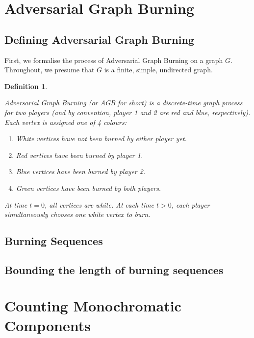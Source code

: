 \documentclass{mpaper}
\newtheorem{definition}{Definition}[section]
\begin{document}
\section{Adversarial Graph Burning}

\subsection{Defining Adversarial Graph Burning}

First, we formalise the process of Adversarial Graph Burning on a graph $G$. Throughout, we presume that $G$ is a finite, simple, undirected graph.

\begin{definition}
\label{def/AGB}

Adversarial Graph Burning (or AGB for short) is a discrete-time graph process for two players (and by convention, player 1 and 2 are red and blue, respectively). Each vertex is assigned one of 4 colours:

\begin{enumerate}
  \item \emph{White} vertices have not been burned by either player yet.
  \item \emph{Red} vertices have been burned by player 1.
  \item \emph{Blue} vertices have been burned by player 2.
  \item \emph{Green} vertices have been burned by \emph{both} players.
\end{enumerate}

At time $t=0$, all vertices are white. At each time $t > 0$, each player simultaneously chooses one white vertex to burn.

\end{definition}

\subsection{Burning Sequences}

\subsection{Bounding the length of burning sequences}

\section{Counting Monochromatic Components}
\end{document}
